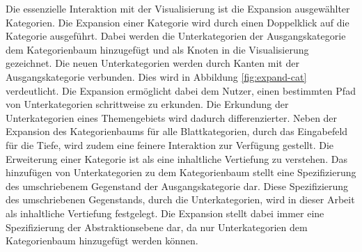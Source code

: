Die essenzielle Interaktion mit der Visualisierung ist die Expansion ausgewählter Kategorien.
Die Expansion einer Kategorie wird durch einen Doppelklick auf die Kategorie ausgeführt.
Dabei werden die Unterkategorien der Ausgangskategorie dem Kategorienbaum hinzugefügt und als Knoten in die Visualisierung gezeichnet.
Die neuen Unterkategorien werden durch Kanten mit der Ausgangskategorie verbunden.
Dies wird in Abbildung \ref{fig:expand-cat} verdeutlicht.
Die Expansion ermöglicht dabei dem Nutzer, einen bestimmten Pfad von Unterkategorien schrittweise zu erkunden.
Die Erkundung der Unterkategorien eines Themengebiets wird dadurch differenzierter. 
Neben der Expansion des Kategorienbaums für alle Blattkategorien, durch das Eingabefeld für die Tiefe, wird zudem eine feinere Interaktion zur Verfügung gestellt.
Die Erweiterung einer Kategorie ist als eine inhaltliche Vertiefung zu verstehen.
Das hinzufügen von Unterkategorien zu dem Kategorienbaum stellt eine Spezifizierung des umschriebenem Gegenstand der Ausgangskategorie dar.
Diese Spezifizierung des umschriebenen Gegenstands, durch die Unterkategorien, wird in dieser Arbeit als inhaltliche Vertiefung festgelegt.
Die Expansion stellt dabei immer eine Spezifizierung der Abstraktionsebene dar, da nur Unterkategorien dem Kategorienbaum hinzugefügt werden können.

